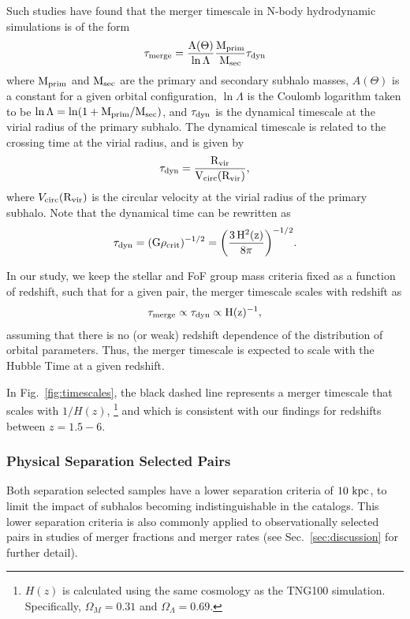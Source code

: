 \documentclass[twocolumn,linenumbers]{aastex631}
\begin{document}
        Such studies have found that the merger timescale in N-body hydrodynamic simulations is of the form
        \begin{equation}
            \rm \tau_{\rm merge} = \frac{A(\Theta)}{\ln \Lambda}\frac{\mprim}{\msec}\tau_{\rm dyn}
        \end{equation}
        where $\rm M_{prim}$ and $\rm M_{sec}$ are the primary and secondary subhalo masses, $A(\Theta)$ is a constant for a given orbital configuration, $\ln\Lambda$ is the Coulomb logarithm taken to be $\ln\Lambda = \ln(1+\rm M_{prim}/\rm M_{sec})$, and $\tau_{\rm dyn}$ is the dynamical timescale at the virial radius of the primary subhalo.
        The dynamical timescale is related to the crossing time at the virial radius, and is given by 
        \begin{equation}
            \rm \tau_{\rm dyn} = \frac{\Rvir}{V_{\rm circ}(\Rvir)},
        \end{equation}
        where $V_{\rm circ}(\rm R_{vir})$ is the circular velocity at the virial radius of the primary subhalo. 
        Note that the dynamical time can be rewritten as 
        \begin{equation}
            \rm \tau_{\rm dyn} = (G\rho_{crit})^{-1/2} = \bigg(\frac{3\,H^2(z)}{8\pi}\bigg)^{-1/2}.
        \end{equation}

        In our study, we keep the stellar and FoF group mass criteria fixed as a function of redshift, such that for a given pair, the merger timescale scales with redshift as
        \begin{equation}
            \rm \tau_{merge} \propto \tau_{dyn} \propto H(z)^{-1},
        \end{equation}
        assuming that there is no (or weak) redshift dependence of the distribution of orbital parameters.
        Thus, the merger timescale is expected to scale with the Hubble Time at a given redshift. 
        
        In Fig.~\ref{fig:timescales}, the black dashed line represents a merger timescale that scales with $1/H(z)$,
        \footnote{$H(z)$ is calculated using the same cosmology as the TNG100 simulation. Specifically, $\Omega_M=0.31$ and $\Omega_{\Lambda}=0.69$.}
        and which is consistent with our findings for redshifts between $z=1.5-6$. 
            

    \subsubsection{Physical Separation Selected Pairs }
    \label{sec:results-phys}
        Both separation selected samples have a lower separation criteria of $10\,\mathrm{\,kpc}$, to limit the impact of subhalos becoming indistinguishable in the \subfind{} catalogs.
        This lower separation criteria is also commonly applied to observationally selected pairs in studies of merger fractions and merger rates (see Sec.~\ref{sec:discussion} for further detail).
        
\end{document}
